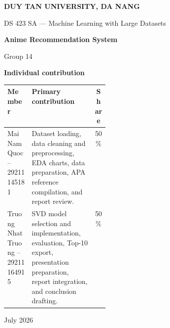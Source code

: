 \documentclass[12pt,a4paper]{article}
\title{\projecttitle}
\author{Group 14}
\date{July 2026}
\newcommand{\projecttitle}{Anime Recommendation System}
\newcommand{\memberone}{Mai Nam Quoc -- 29211145181}
\newcommand{\membertwo}{Truong Nhat Truong -- 29211164915}
\let\memberonefull\memberone
\let\membertwofull\membertwo
\renewcommand{\memberone}{Quoc }
\renewcommand{\membertwo}{Truong }
\begin{document}
\begin{titlepage}
  \centering
  {\Large \textbf{DUY TAN UNIVERSITY, DA NANG}\par}
  \vspace{1.2cm}
  {\large DS 423 SA --- Machine Learning with Large Datasets\par}
  \vspace{2.0cm}
  {\LARGE \textbf{\projecttitle}\par}
  \vspace{1.4cm}
  {\large Group 14\par}
  \vspace{1.2cm}

  \vspace{0.9cm}
  {\large \textbf{Individual contribution}\par}
  \vspace{0.35cm}
  \small
  \begin{tabularx}{\linewidth}{p{0.24\linewidth}Yc}
    \toprule
    \textbf{Member} & \textbf{Primary contribution} & \textbf{Share} \\
    \midrule
    \memberonefull & Dataset loading, data cleaning and preprocessing, EDA charts, data preparation, APA reference compilation, and report review. & 50\% \\
    \membertwofull & SVD model selection and implementation, evaluation, Top-10 export, presentation preparation, report integration, and conclusion drafting. & 50\% \\
    \bottomrule
  \end{tabularx}
  \par
  \vspace{0.25cm}
  \par
  \vfill
  \vspace{0.8cm}
  {\large July 2026\par}
\end{titlepage}
\end{document}
